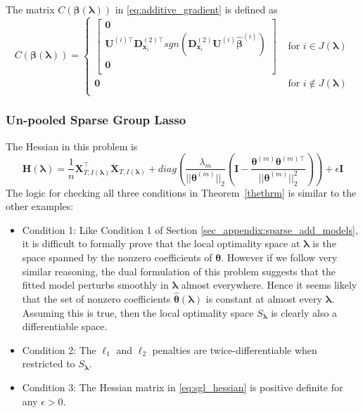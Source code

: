 \documentclass[12pt,letterpaper]{article}
\begin{document}
The matrix $C(\boldsymbol \beta( \boldsymbol \lambda))$ in \eqref{eq:additive_gradient} is defined as
\begin{equation}
C(\boldsymbol \beta( \boldsymbol \lambda))
= \begin{cases}
\begin{bmatrix}
\boldsymbol{0} \\
\boldsymbol {U}^{(i)\top}  \boldsymbol{D}^{(2)\top}_{\boldsymbol{x}_i} 
sgn( \boldsymbol{D}^{(2)}_{\boldsymbol{x}_i} \boldsymbol {U}^{(i)} \hat{\boldsymbol{\beta}}^{(i)}) \\
\boldsymbol{0} \\
\end{bmatrix}
& \text{ for } i \in J(\boldsymbol \lambda) \\
\boldsymbol{0}
& \text{ for } i \not\in J(\boldsymbol \lambda) \\
\end{cases}
\end{equation}


\subsubsection{Un-pooled Sparse Group Lasso}
The Hessian in this problem is
\begin{equation}
\boldsymbol{H}(\boldsymbol\lambda) =
\frac{1}{n} \boldsymbol X_{T, I(\boldsymbol \lambda)}^\top \boldsymbol X_{T, I(\boldsymbol \lambda)}
+ diag\left(
\frac{\lambda_m}{|| \boldsymbol \theta^{(m)}||_2}
\left (
\boldsymbol I - 
\frac{\boldsymbol \theta^{(m)} \boldsymbol \theta^{(m) \top}}{|| \boldsymbol \theta^{(m)}||_2^2}
\right )
\right)
+ \epsilon \boldsymbol I
\label{eq:sgl_hessian}
\end{equation}
The logic for checking all three conditions in Theorem~\ref{thethrm} is similar to the other examples:
\begin{itemize}
	\item[] Condition 1: Like Condition 1 of Section \ref{sec_appendix:sparse_add_models}, it is difficult to formally prove that the local optimality space at $\boldsymbol{\lambda}$ is the space spanned by the nonzero coefficients of $\boldsymbol{\theta}$. However if we follow very similar reasoning, the dual formulation of this problem suggests that the fitted model perturbs smoothly in $\boldsymbol{\lambda}$ almost everywhere. Hence it seems likely that the set of nonzero coefficients $\hat{\boldsymbol{\theta}}(\boldsymbol{\lambda})$ is constant at almost every $\boldsymbol{\lambda}$. Assuming this is true, then the local optimality space $S_{\boldsymbol{\lambda}}$ is clearly also a differentiable space.
	\item[] Condition 2: The $\ell_1$ and $\ell_2$ penalties are twice-differentiable when restricted to $S_{\boldsymbol{\lambda}}$.\hfill {}
	\item[] Condition 3: The Hessian matrix in \eqref{eq:sgl_hessian} is positive definite for any $\epsilon > 0$. \hfill {}
\end{itemize}
\end{document}
